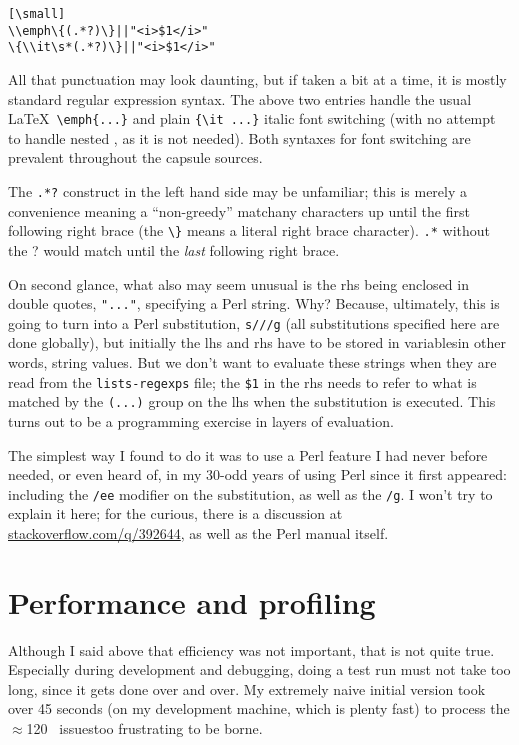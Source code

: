 \documentclass[final]{ltugboat}
\def\enddanger{\endgraf\endgroup\egroup} %
\def\code#1{{\tt #1}}
\begin{document}
\begin{verbatim}[\small]
\\emph\{(.*?)\}||"<i>$1</i>"
\{\\it\s*(.*?)\}||"<i>$1</i>"
\end{verbatim}
All that punctuation may look daunting, but if taken a bit at a time, it
is mostly standard regular expression syntax. The above two entries
handle the usual \LaTeX\ \verb|\emph{...}| and plain \verb|{\it ...}|
italic font switching (with no attempt to handle nested , as it
is not needed). Both syntaxes for font switching are prevalent
throughout the capsule sources.

The \code{.*?} construct in the left hand side may be unfamiliar; this
is merely a convenience meaning a ``non-greedy'' match\Dash any
characters up until the first following right brace (the \verb|\}| means
a literal right brace character). \code{.*} without the {?} would match
until the \emph{last} following right brace.

\ddanger On second glance, what also may seem unusual is the rhs being
enclosed in double quotes, \code{"..."}, specifying a Perl string. Why?
Because, ultimately, this is going to turn into a Perl substitution,
\code{s///g} (all substitutions specified here are
done globally), but initially the lhs and rhs have to be stored in
variables\Dash in other words, string values. But we don't want to
evaluate these strings when they are read from the \code{lists-regexps}
file; the \code{\$1} in the rhs needs to refer to what is matched by the
\code{(...)} group on the lhs when the substitution is executed. This
turns out to be a programming exercise in layers of evaluation.
\enddanger

\ddanger The simplest way I found to do it was to use a Perl feature I
had never before needed, or even heard of, in my 30-odd years of using
Perl since it first appeared: including the \code{/ee} modifier on the
substitution, as well as the \code{/g}. I won't try to explain it here;
for the curious, there is a discussion at
\url{stackoverflow.com/q/392644}, as well as the Perl manual itself.
\enddanger

\section{Performance and profiling}

Although I said above that efficiency was not important, that is not
quite true. Especially during development and debugging, doing a test
run must not take too long, since it gets done over and over. My
extremely naive initial version took over 45 seconds (on my development
machine, which is plenty fast) to process the $\approx$120 \TUB\
issues\Dash too frustrating to be borne.
\end{document}
